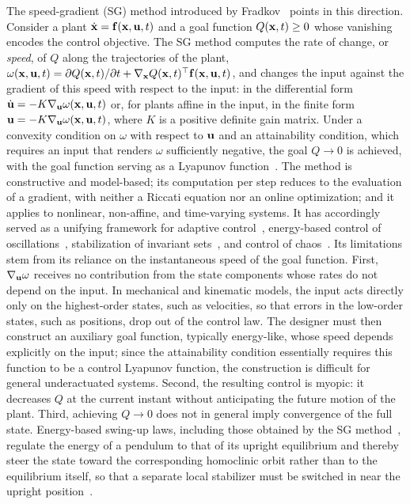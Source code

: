 The speed-gradient (SG) method introduced by Fradkov~\citep{fradkov1979speed,fradkov1999nonlinear}
points in this direction.
Consider a plant $\dot{\mathbf{x}} = \mathbf{f}(\mathbf{x},\mathbf{u},t)$ and a goal function $Q(\mathbf{x},t) \ge 0$ whose
vanishing encodes the control objective.
The SG method computes the rate of change, or \emph{speed}, of $Q$ along the trajectories of the
plant, $\omega(\mathbf{x},\mathbf{u},t) = \partial Q(\mathbf{x},t)/\partial t + \nabla_{\mathbf{x}} Q(\mathbf{x},t)^\top
\mathbf{f}(\mathbf{x},\mathbf{u},t)$, and changes the input against the gradient of this speed with respect to
the input: in the differential form $\dot{\mathbf{u}} = -K \nabla_{\mathbf{u}}\omega(\mathbf{x},\mathbf{u},t)$ or, for plants
affine in the input, in the finite form $\mathbf{u} = -K \nabla_{\mathbf{u}}\omega(\mathbf{x},\mathbf{u},t)$, where $K$ is a
positive definite gain matrix.
Under a convexity condition on $\omega$ with respect to $\mathbf{u}$ and an attainability condition, which
requires an input that renders $\omega$ sufficiently negative, the goal $Q \to 0$ is achieved,
with the goal function serving as a Lyapunov function~\citep{fradkov1999nonlinear}.
The method is constructive and model-based; its computation per step reduces to the evaluation
of a gradient, with neither a Riccati equation nor an online optimization; and it applies to
nonlinear, non-affine, and time-varying systems.
It has accordingly served as a unifying framework for adaptive control~\citep{fradkov1979speed},
energy-based control of oscillations~\citep{fradkov1996swinging}, stabilization of invariant
sets~\citep{shiriaev2000stabilization}, and control of chaos~\citep{fradkov2007cybernetical}.
Its limitations stem from its reliance on the instantaneous speed of the goal function.
First, $\nabla_{\mathbf{u}}\omega$ receives no contribution from the state components whose rates do not
depend on the input.
In mechanical and kinematic models, the input acts directly only on the highest-order states,
such as velocities, so that errors in the low-order states, such as positions, drop out of the
control law.
The designer must then construct an auxiliary goal function, typically energy-like, whose speed
depends explicitly on the input; since the attainability condition essentially requires this
function to be a control Lyapunov function, the construction is difficult for general
underactuated systems.
Second, the resulting control is myopic: it decreases $Q$ at the current instant without
anticipating the future motion of the plant.
Third, achieving $Q \to 0$ does not in general imply convergence of the full state.
Energy-based swing-up laws, including those obtained by the SG
method~\citep{fradkov1996swinging}, regulate the energy of a pendulum to that of its upright
equilibrium and thereby steer the state toward the corresponding homoclinic orbit rather than to
the equilibrium itself, so that a separate local stabilizer must be switched in near the upright
position~\citep{astrom2000swinging,shiriaev2000global}.

